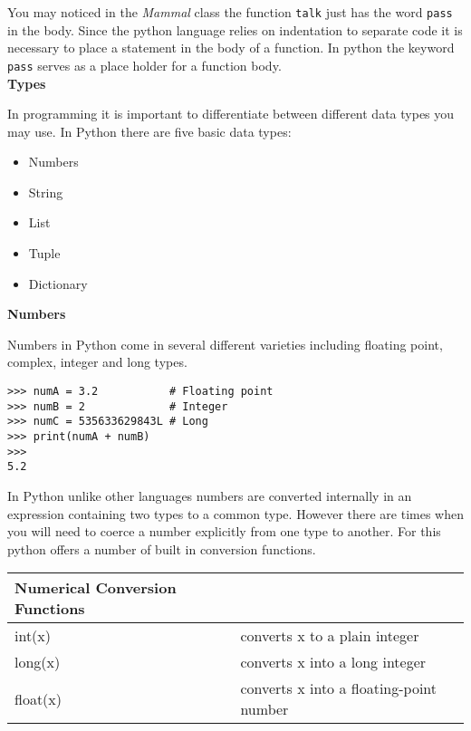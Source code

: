 \documentclass[letterpaper,11pt]{article}
\begin{document}
\par{You may noticed in the \textit{Mammal} class the function \texttt{talk}
    just has the word \texttt{pass} in the body. Since the python language relies
    on indentation to separate code it is necessary to place a statement in the
    body of a function. In python the keyword \texttt{pass} serves as a place
    holder for a function body.}
\\
\textbf{Types}
\par{In programming it is important to differentiate between different data
types you may use. In Python there are five basic data types: }
\begin{itemize}
    \setlength\itemsep{1pt}
    \item Numbers
    \item String
    \item List
    \item Tuple
    \item Dictionary
\end{itemize}
\textbf{Numbers}
\par{Numbers in Python come in several different varieties
including floating point, complex, integer and long types.}
\\
\begin{minipage}{.5\textwidth}
    \begin{tcolorbox}
        \begin{footnotesize}
            \begin{verbatim}
>>> numA = 3.2           # Floating point
>>> numB = 2             # Integer
>>> numC = 535633629843L # Long
>>> print(numA + numB)
>>>
5.2
            \end{verbatim}
        \end{footnotesize}
    \end{tcolorbox}
\end{minipage}
\par{In Python unlike other languages numbers are converted internally in an
expression containing two types to a common type. However there are times when
you will need to coerce a number explicitly from one type to another. For this
python offers a number of built in conversion functions.}
\\
\begin{tabular}[t]{l l}
    \textbf{Numerical Conversion Functions} &                                                   \\
    \hline
    int(x)       & converts x to a plain integer                                                \\
    long(x)      & converts x into a long integer                                               \\
    float(x)     & converts x into a floating-point number                                      \\
\end{tabular}
\end{document}
